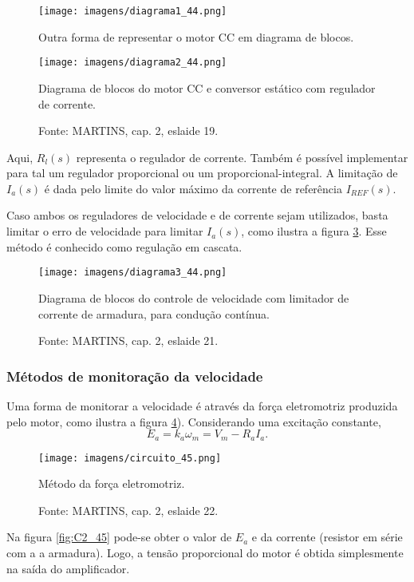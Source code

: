 \begin{figure}[ht!]
\center
\texttt{[image: imagens/diagrama1\_44.png]}
\caption{\label{fig:D1_44}Outra forma de representar o motor CC em diagrama de blocos.}
\end{figure} 

\begin{figure}[ht!]
\center
\texttt{[image: imagens/diagrama2\_44.png]}
\caption{\label{fig:D2_44}Diagrama de blocos do  motor CC e conversor estático com regulador de corrente.}
\caption*{Fonte: MARTINS, cap. 2, eslaide 19.}
\end{figure} 

Aqui, $R_{l}(s)$ representa o regulador de corrente. Também é possível implementar para tal um regulador proporcional ou um proporcional-integral. A limitação de $I_{a}(s)$ é dada pelo limite do valor máximo da corrente de referência $I_{REF}(s)$.

Caso ambos os reguladores de velocidade e de corrente sejam utilizados, basta limitar o erro de velocidade para limitar $I_{a}(s)$, como ilustra a figura \ref{fig:D3_44}. Esse método é conhecido como regulação em cascata.

\begin{figure}[ht!]
\center
\texttt{[image: imagens/diagrama3\_44.png]}
\caption{\label{fig:D3_44}Diagrama de blocos do controle de velocidade com limitador de corrente de armadura, para condução contínua.}
\caption*{Fonte: MARTINS, cap. 2, eslaide 21.}
\end{figure} 

\subsubsection{Métodos de monitoração da velocidade}

Uma forma de monitorar a velocidade é através da força eletromotriz produzida pelo motor, como ilustra a figura \ref{fig:C1_45}). Considerando uma excitação constante,
\[E_{a} = k_{a}\omega_{m} = V_{m} - R_{a}I_{a}.\]

\begin{figure}[ht!]
\center
\texttt{[image: imagens/circuito\_45.png]}
\caption{\label{fig:C1_45} Método da força eletromotriz.}
\caption*{Fonte: MARTINS, cap. 2, eslaide 22.}
\end{figure} 

Na figura \ref{fig:C2_45} pode-se obter o valor de $E_{a}$ e da corrente (resistor em série com a a armadura). Logo, a tensão proporcional do motor é obtida simplesmente na saída do amplificador.

